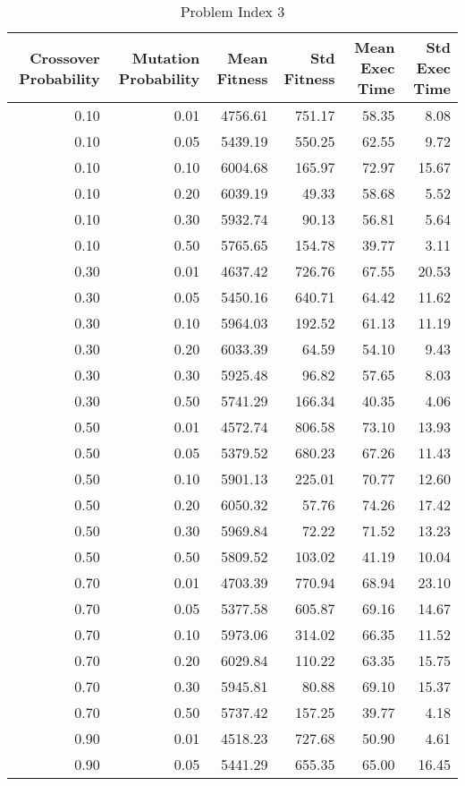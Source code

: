 \begin{table}
\caption{Problem Index 3}
\label{tab:problem_3}
\begin{tabular}{rrrrrr}
\toprule
Crossover Probability & Mutation Probability & Mean Fitness & Std Fitness & Mean Exec Time & Std Exec Time \\
\midrule
0.10 & 0.01 & 4756.61 & 751.17 & 58.35 & 8.08 \\
0.10 & 0.05 & 5439.19 & 550.25 & 62.55 & 9.72 \\
0.10 & 0.10 & 6004.68 & 165.97 & 72.97 & 15.67 \\
0.10 & 0.20 & 6039.19 & 49.33 & 58.68 & 5.52 \\
0.10 & 0.30 & 5932.74 & 90.13 & 56.81 & 5.64 \\
0.10 & 0.50 & 5765.65 & 154.78 & 39.77 & 3.11 \\
0.30 & 0.01 & 4637.42 & 726.76 & 67.55 & 20.53 \\
0.30 & 0.05 & 5450.16 & 640.71 & 64.42 & 11.62 \\
0.30 & 0.10 & 5964.03 & 192.52 & 61.13 & 11.19 \\
0.30 & 0.20 & 6033.39 & 64.59 & 54.10 & 9.43 \\
0.30 & 0.30 & 5925.48 & 96.82 & 57.65 & 8.03 \\
0.30 & 0.50 & 5741.29 & 166.34 & 40.35 & 4.06 \\
0.50 & 0.01 & 4572.74 & 806.58 & 73.10 & 13.93 \\
0.50 & 0.05 & 5379.52 & 680.23 & 67.26 & 11.43 \\
0.50 & 0.10 & 5901.13 & 225.01 & 70.77 & 12.60 \\
0.50 & 0.20 & 6050.32 & 57.76 & 74.26 & 17.42 \\
0.50 & 0.30 & 5969.84 & 72.22 & 71.52 & 13.23 \\
0.50 & 0.50 & 5809.52 & 103.02 & 41.19 & 10.04 \\
0.70 & 0.01 & 4703.39 & 770.94 & 68.94 & 23.10 \\
0.70 & 0.05 & 5377.58 & 605.87 & 69.16 & 14.67 \\
0.70 & 0.10 & 5973.06 & 314.02 & 66.35 & 11.52 \\
0.70 & 0.20 & 6029.84 & 110.22 & 63.35 & 15.75 \\
0.70 & 0.30 & 5945.81 & 80.88 & 69.10 & 15.37 \\
0.70 & 0.50 & 5737.42 & 157.25 & 39.77 & 4.18 \\
0.90 & 0.01 & 4518.23 & 727.68 & 50.90 & 4.61 \\
0.90 & 0.05 & 5441.29 & 655.35 & 65.00 & 16.45 \\

\end{tabular}
\end{table}
